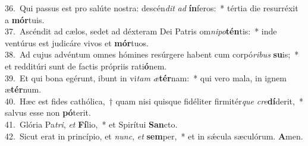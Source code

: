 {36.~}Qui passus est pro salúte nostra: descén\textit{dit} \textit{ad} \textbf{ín}feros:~* tértia die resurréxit a \textbf{mór}tuis.\\
{37.~}Ascéndit ad cælos, sedet ad déxteram Dei Patris om\textit{ni}\textit{po}\textbf{tén}tis:~* inde ventúrus est judicáre vivos et \textbf{mór}tuos.\\
{38.~}Ad cujus advéntum omnes hómines resúrgere habent cum corpó\textit{ri}\textit{bus} \textbf{su}is;~* et redditúri sunt de factis própriis rati\textbf{ó}nem.\\
{39.~}Et qui bona egérunt, ibunt in vi\textit{tam} \textit{æ}\textbf{tér}nam:~* qui vero mala, in ignem æ\textbf{tér}num.\\
{40.~}Hæc est fides cathólica,~† quam nisi quisque fidéliter firmitér\textit{que} \textit{cre}\textbf{dí}derit,~* salvus esse non \textbf{pó}terit.\\
{41.~}Glória Pa\textit{tri}, \textit{et} \textbf{Fí}lio,~* et Spirítui \textbf{San}cto.\\
{42.~}Sicut erat in princípio, et \textit{nunc}, \textit{et} \textbf{sem}per,~* et in sǽcula sæculórum. \textbf{A}men.\\
